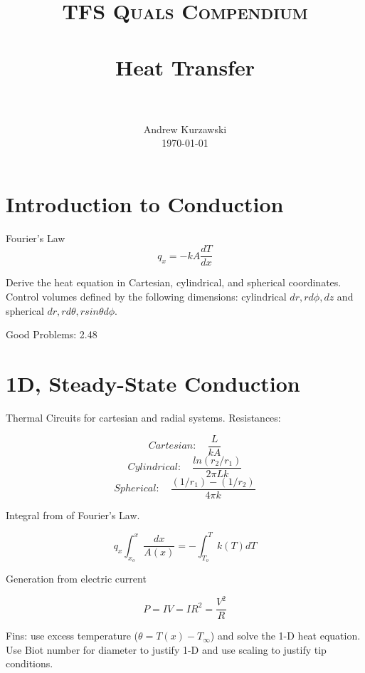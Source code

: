 \documentclass[paper=letter, fontsize=11pt]{scrartcl}
\title{
        \usefont{OT1}{bch}{b}{n}
        \normalfont \normalsize \textsc{TFS Quals Compendium} \\ [25pt]
        \horrule{0.5pt} \\[0.4cm]
        \huge Heat Transfer \\
        \horrule{2pt} \\[0.5cm]
}
\author{
        \normalfont                                 \normalsize
        Andrew Kurzawski\\[-3pt]      \normalsize
        \today
}
\date{}
\numberwithin{equation}{section}        %
\numberwithin{figure}{section}          %
\numberwithin{table}{section}               %
\begin{document}
\maketitle


\section{Introduction to Conduction}

Fourier's Law 
\begin{equation}
q_x = -kA\frac{dT}{dx}
\end{equation}

Derive the heat equation in Cartesian, cylindrical, and spherical coordinates. Control volumes defined by the following dimensions: cylindrical $dr, rd\phi, dz$ and spherical $dr, rd\theta, rsin\theta d\phi$.

\bigskip Good Problems: 2.48


\section{1D, Steady-State Conduction}

Thermal Circuits for cartesian and radial systems. Resistances:

\begin{equation}
Cartesian:\quad \frac{L}{kA}
\end{equation}
\begin{equation}
Cylindrical:\quad \frac{ln(r_2/r_1)}{2\pi Lk}
\end{equation}
\begin{equation}
Spherical:\quad \frac{(1/r_1)-(1/r_2)}{4\pi k}
\end{equation}

Integral from of Fourier's Law.

\begin{equation}
q_x\int_{x_o}^x \frac{dx}{A(x)} = -\int_{T_o}^T k(T)dT
\end{equation}

Generation from electric current

\begin{equation}
P = IV = IR^2 = \frac{V^2}{R}
\end{equation}

Fins: use excess temperature ($\theta = T(x) - T_\infty$) and solve the 1-D heat equation. Use Biot number for diameter to justify 1-D and use scaling to justify tip conditions.
\end{document}
